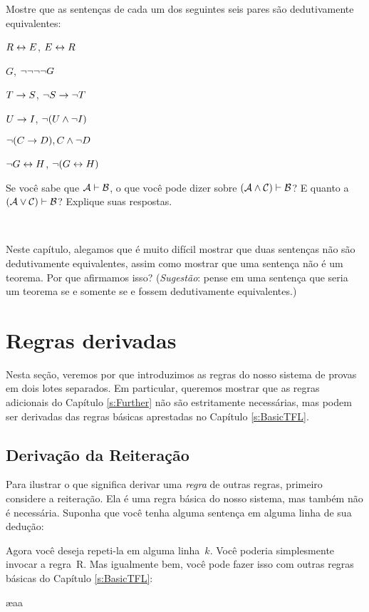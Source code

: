 \problempart
Mostre que as sentenças de cada um dos seguintes seis pares são dedutivamente equivalentes:
\begin{earg}
\item $R \leftrightarrow E$, $E \leftrightarrow R$
\item $G$, $\neg\neg\neg\neg G$
\item $T\rightarrow S$, $\neg S \rightarrow \neg T$
\item $U \rightarrow I$, $\neg(U \wedge \neg I)$
\item $\neg (C \rightarrow D), C \wedge \neg D$
\item $\neg G \leftrightarrow H$, $\neg(G \leftrightarrow H)$ 
\end{earg}

\problempart
 Se você sabe que $\mathcal{A}\vdash\mathcal{B}$, o que você pode dizer sobre $(\mathcal{A}\wedge\mathcal{C})\vdash\mathcal{B}$? E quanto a $(\mathcal{A}\vee\mathcal{C})\vdash\mathcal{B}$? Explique suas respostas.

\

\problempart Neste capítulo, alegamos que é muito difícil mostrar que duas sentenças não são dedutivamente equivalentes, assim como mostrar que uma sentença não é um teorema. Por que afirmamos isso? (\emph{Sugestão}: pense em uma sentença que seria um teorema se e somente se  e  fossem dedutivamente equivalentes.)



\chapter{Regras derivadas}\label{s:Derived}
Nesta seção, veremos por que introduzimos as regras do nosso sistema de provas em dois lotes separados. Em particular, queremos mostrar que as regras adicionais do Capítulo \ref{s:Further} não são estritamente necessárias, mas podem ser derivadas das regras básicas aprestadas no Capítulo \ref{s:BasicTFL}. 

\section{Derivação da Reiteração}
Para ilustrar o que significa derivar uma   \emph{regra} de outras regras, primeiro considere a reiteração. Ela é uma regra básica do nosso sistema, mas também não é necessária. Suponha que você tenha alguma sentença em alguma linha de sua dedução:
\begin{fitchproof}
\end{fitchproof}
Agora você deseja repeti-la em alguma linha~$k$. Você poderia simplesmente invocar a regra~R. Mas igualmente bem, você pode fazer isso com outras regras básicas do Capítulo \ref{s:BasicTFL}:
\begin{fitchproof}
	\ae{aa}
\end{fitchproof}


